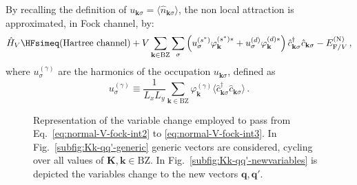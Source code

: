 By recalling the definition of $u_{\mathbf{k}\sigma} = \langle \hat n_{\mathbf{k}\sigma} \rangle$, the non local attraction is approximated, in Fock channel, by:
\begin{equation}\label{eq:normal-HV-fock-approx}
	\hat H_V \HFsimeq (\text{Hartree channel}) + 
	V
	\sum_{\mathbf{k}\in\mathrm{BZ}} \sum_\sigma
	\left(
		u^{(s^*)}_\sigma
		\varphi_\mathbf{k}^{(s^*)*} + u^{(d)}_\sigma
		\varphi_\mathbf{k}^{(d)*}
	\right)
	\hat c_{\mathbf{k}\sigma}^\dagger
	\hat c_{\mathbf{k}\sigma} - E_{\mathrm{F}/V}^{(\mathrm{N})} \, ,
\end{equation}
where $u_\sigma^{(\gamma)}$ are the harmonics of the occupation $u_{\mathbf{k}\sigma}$, defined as
\begin{equation}\label{eq:normal-ugamma-harmonics}
	u^{(\gamma)}_\sigma \equiv \frac{1}{L_x L_y} \sum_{\mathbf{k}\in\mathrm{BZ}} \varphi_\mathbf{k}^{(\gamma)}
	\langle
	\hat c_{\mathbf{k}\sigma}^\dagger
	\hat c_{\mathbf{k}\sigma}
	\rangle \, .
\end{equation}

\begin{figure}
	\def\Kx{0.5}
	\def\Ky{0.2}
	\def\kx{0.1}
	\def\ky{0.7}
	\centering
	\caption{Representation of the variable change employed to pass from Eq.~\eqref{eq:normal-V-fock-int2} to \eqref{eq:normal-V-fock-int3}. In Fig.~\ref{subfig:Kk-qq'-generic} generic vectors are considered, cycling over all values of $\mathbf{K},\mathbf{k}\in\mathrm{BZ}$. In Fig.~\ref{subfig:Kk-qq'-newvariables} is depicted the variables change to the new vectors $\mathbf{q},\mathbf{q}'$.}
	\label{fig:Kk-qq'}
\end{figure}

